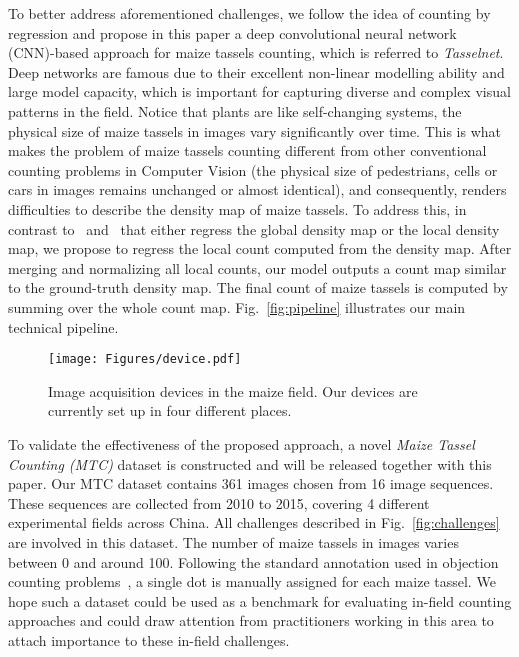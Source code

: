 \documentclass[twocolumn]{bmcart}%
\begin{document}
To better address aforementioned challenges, we follow the idea of counting by regression and propose in this paper a deep convolutional neural network~\cite{Krizhevsky2012} (CNN)-based approach for maize tassels counting, which is referred to \textit{Tasselnet}. Deep networks are famous due to their excellent non-linear modelling ability and large model capacity, which is important for capturing diverse and complex visual patterns in the field. Notice that plants are like self-changing systems, the physical size of maize tassels in images vary significantly over time. This is what makes the problem of maize tassels counting different from other conventional counting problems in Computer Vision (the physical size of pedestrians, cells or cars in images remains unchanged or almost identical), and consequently, renders difficulties to describe the density map of maize tassels. To address this, in contrast to~\cite{vlaz2010denlearn} and~\cite{onoro2016towards} that either regress the global density map or the local density map, we propose to regress the local count computed from the density map. After merging and normalizing all local counts, our model outputs a count map similar to the ground-truth density map. The final count of maize tassels is computed by summing over the whole count map. Fig.~\ref{fig:pipeline} illustrates our main technical pipeline.

\begin{figure*}[!h]
	\centering
	\texttt{[image: Figures/device.pdf]}
	\caption{Image acquisition devices in the maize field. Our devices are currently set up in four different places.}
	\label{fig:device}
\end{figure*}

To validate the effectiveness of the proposed approach, a novel \emph{Maize Tassel Counting (MTC)} dataset is constructed and will be released together with this paper. Our MTC dataset contains 361 images chosen from 16 image sequences. These sequences are collected from 2010 to 2015, covering 4 different experimental fields across China. All challenges described in Fig.~\ref{fig:challenges} are involved in this dataset. The number of maize tassels in images varies between 0 and around 100. Following the standard annotation used in objection counting problems~\cite{vlaz2010denlearn}, a single dot is manually assigned for each maize tassel. We hope such a dataset could be used as a benchmark for evaluating in-field counting approaches and could draw attention from practitioners working in this area to attach importance to these in-field challenges.
\end{document}

